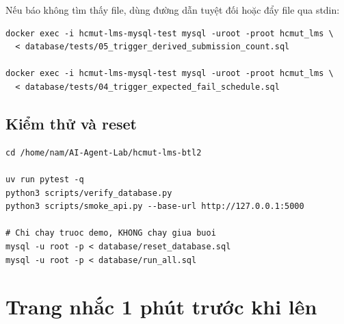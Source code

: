 \documentclass[a4paper,13pt]{extarticle}
\newcommand{\code}[1]{\texttt{\detokenize{#1}}}
\begin{document}
Nếu \code{SOURCE} báo không tìm thấy file, dùng đường dẫn tuyệt đối hoặc đẩy file qua stdin:

\begin{lstlisting}[style=shell]
docker exec -i hcmut-lms-mysql-test mysql -uroot -proot hcmut_lms \
  < database/tests/05_trigger_derived_submission_count.sql

docker exec -i hcmut-lms-mysql-test mysql -uroot -proot hcmut_lms \
  < database/tests/04_trigger_expected_fail_schedule.sql
\end{lstlisting}

\subsection{Kiểm thử và reset}

\begin{lstlisting}[style=shell]
cd /home/nam/AI-Agent-Lab/hcmut-lms-btl2

uv run pytest -q
python3 scripts/verify_database.py
python3 scripts/smoke_api.py --base-url http://127.0.0.1:5000

# Chi chay truoc demo, KHONG chay giua buoi
mysql -u root -p < database/reset_database.sql
mysql -u root -p < database/run_all.sql
\end{lstlisting}

\section{Trang nhắc 1 phút trước khi lên}
\end{document}
